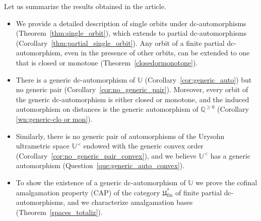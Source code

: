 \documentclass[10pt,a4paper]{article}
\theoremstyle{definition}
\theoremstyle{remark}
\newcommand \Q {\mathbb{Q}}
\newcommand \Qpos {\Q^{\geq 0}}
\newcommand \U {\mathbb{U}}
\newcommand \fin {{\operatorname{fin}}}
\newcommand \Ult {\mathfrak{U}}
\begin{document}
Let us summarize the results obtained in the article.
\begin{itemize}
    \item We provide a detailed description of single orbits under dc-automorphisms  (Theorem~\ref{thm:single_orbit}), which extends to partial dc-automorphisms (Corollary~\ref{thm:partial_single_orbit}).
    Any orbit of a finite partial dc-automorphism, even in the presence of other orbits, can be extended to one that is closed or monotone (Theorem~\ref{closedormonotone}).
    
    \item There is a generic dc-automorphism of $\U$ (Corollary~\ref{cor:generic_auto}) but no generic pair (Corollary~\ref{cor:no_generic_pair}).
    Moreover, every orbit of the generic dc-automorphism is either closed or monotone, and the induced automorphism on distances is the generic automorphism of $\Qpos$ (Corollary \ref{wn:generic-clo or mon}).

    \item Similarly, there is no generic pair of automorphisms of the Urysohn ultrametric space $\U^\prec$ endowed with the generic convex order (Corollary~\ref{cor:no_generic_pair_convex}), and we believe $\U^\prec$ has a generic automorphism (Question~\ref{que:generic_auto_convex}).

    \item To show the existence of a generic dc-automorphism of $\U$ we prove the cofinal amalgamation property (CAP) of the category $\Ult^*_\fin$ of finite partial dc-automorphisms, and we characterize amalgamation bases (Theorem~\ref{spaces_totaliz}).


\end{itemize}
\end{document}
